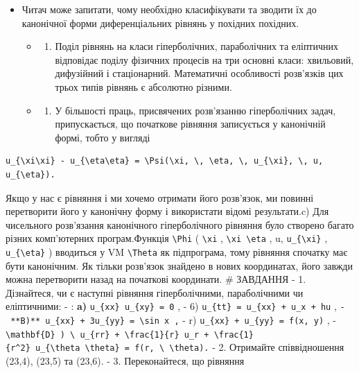 \documentclass[
  ukrainian,
]{article}
\providecommand{\tightlist}{%
  \setlength{\itemsep}{0pt}\setlength{\parskip}{0pt}}
\begin{document}
\begin{itemize}
\tightlist
\item
  Читач може запитати, чому необхідно класифікувати та зводити їх до
  канонічної форми диференціальних рівнянь у похідних похідних.

  \begin{itemize}
  \tightlist
  \item
    \begin{enumerate}
    \def\labelenumi{\alph{enumi})}
    \tightlist
    \item
      Поділ рівнянь на класи гіперболічних, параболічних та еліптичних
      відповідає поділу фізичних процесів на три основні класи:
      хвильовий, дифузійний і стаціонарний. Математичні особливості
      розв'язків цих трьох типів рівнянь є абсолютно різними.
    \end{enumerate}
  \item
    \begin{enumerate}
    \def\labelenumi{\alph{enumi})}
    \setcounter{enumi}{1}
    \tightlist
    \item
      У більшості праць, присвячених розв'язанню гіперболічних задач,
      припускається, що початкове рівняння записується у канонічній
      формі, тобто у вигляді
    \end{enumerate}
  \end{itemize}
\end{itemize}

\begin{verbatim}
u_{\xi\xi} - u_{\eta\eta} = \Psi(\xi, \, \eta, \, u_{\xi}, \, u, u_{\eta}).
\end{verbatim}

Якщо у нас є рівняння і ми хочемо отримати його розв'язок, ми повинні
перетворити його у канонічну форму і використати відомі результати.c)
Для чисельного розв'язання канонічного гіперболічного рівняння було
створено багато різних комп'ютерних програм.Функція
\texttt{\textbackslash{}Phi} ( \texttt{\textbackslash{}xi} ,
\texttt{\textbackslash{}xi\ \textbackslash{}eta} , u,
\texttt{u\_\{\textbackslash{}xi\}} , \texttt{u\_\{\textbackslash{}eta\}}
) вводиться у VM \texttt{\textbackslash{}Theta} як підпрограма, тому
рівняння спочатку має бути канонічним. Як тільки розв'язок знайдено в
нових координатах, його завжди можна перетворити назад на початкові
координати. \# ЗАВДАННЯ - 1. Дізнайтеся, чи є наступні рівняння
гіперболічними, параболічними чи еліптичними: - : \textbf{a)}
\texttt{u\_\{xx\}\ u\_\{xy\}\ =\ 0} , - 6)
\texttt{u\_\{tt\}\ =\ u\_\{xx\}\ +\ u\_x\ +\ hu} ,
\texttt{-\ **B)**\ \textquotesingle{}u\_\{xx\}\ +\ 3u\_\{yy\}\ =\ \textbackslash{}sin\ x\textquotesingle{}\ ,}
- r) \texttt{u\_\{xx\}\ +\ u\_\{yy\}\ =\ f(x,\ y)} , -
\texttt{\textbackslash{}mathbf\{D\}\ )\ \textbackslash{}\ u\_\{rr\}\ +\ \textbackslash{}frac\{1\}\{r\}\ u\_r\ +\ \textbackslash{}frac\{1\}\{r\^{}2\}\ u\_\{\textbackslash{}theta\ \textbackslash{}theta\}\ =\ f(r,\ \textbackslash{}\ \textbackslash{}theta).}
- 2. Отримайте співвідношення (23,4), (23,5) та (23,6). - 3.
Переконайтеся, що рівняння
\end{document}
